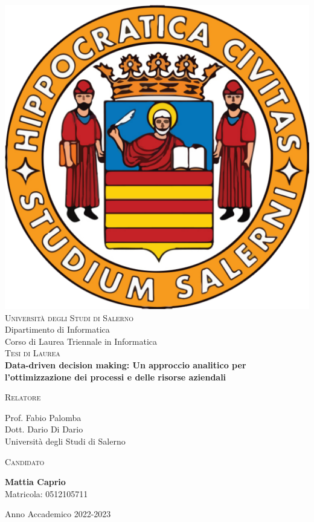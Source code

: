 \begin{titlepage}
\changepage{}{}{}{-7.5 mm}{}{}{}{}{}


\begin{center}
\vspace{0.5cm}
\includegraphics [width=.15\columnwidth, angle=0]{covermatter/figure/logo-unisa}\\ %
{\Large \scshape Università degli Studi di Salerno}\\
\vspace{0.5cm}
{\Large Dipartimento di Informatica}\\
\vspace{0.5cm}
{\Large Corso di Laurea Triennale in Informatica}\\
\vspace{1.5cm}
{\Large \scshape Tesi di Laurea} \\
\vspace{4cm}
{\Huge \bfseries Data-driven decision making: Un approccio analitico per l'ottimizzazione dei processi e delle risorse aziendali} \\
\vspace{4cm}

\begin{minipage}[t]{7cm}
\flushleft
{\large \textsc{Relatore}}

{\large Prof. Fabio Palomba} \\
{\large Dott. Dario Di Dario} \\
Università degli Studi di Salerno \\[0.25cm]
\end{minipage}
\hfill
\begin{minipage}[t]{7cm}
\flushright
{\large \textsc{Candidato}}

{\large \textbf{Mattia Caprio}} \\
Matricola: 0512105711
\end{minipage}

\vspace{3cm}

{\small Anno Accademico 2022-2023} %
%
%
\end{center}

\end{titlepage}
